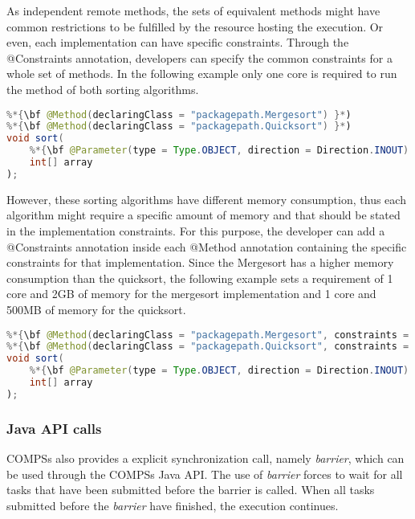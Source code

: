 As independent remote methods, the sets of equivalent methods might have common restrictions to be
fulfilled by the resource hosting the execution. Or even, each implementation can have specific constraints.
Through the @Constraints annotation, developers can specify the common constraints for a whole set of
methods. In the following example only one core is required to run the method of both sorting algorithms.

\begin{lstlisting}[language=java]
%*{\bf @Constraints(computingUnits = "1") }*)
%*{\bf @Method(declaringClass = "packagepath.Mergesort") }*)
%*{\bf @Method(declaringClass = "packagepath.Quicksort") }*)  
void sort(
    %*{\bf @Parameter(type = Type.OBJECT, direction = Direction.INOUT) }*)
    int[] array
);
\end{lstlisting}

However, these sorting algorithms have different memory consumption, thus each algorithm might require a
specific amount of memory and that should be stated in the implementation constraints. For this purpose, the
developer can add a @Constraints annotation inside each @Method annotation containing the specific constraints for that
implementation. Since the Mergesort has a higher memory consumption than the quicksort, the following
example sets a requirement of 1 core and 2GB of memory for the mergesort implementation and 1 core and
500MB of memory for the quicksort.

\begin{lstlisting}[language=java]
%*{\bf @Constraints(computingUnits = "1") }*)
%*{\bf @Method(declaringClass = "packagepath.Mergesort", constraints = @Constraints(memorySize = "2.0")) }*)
%*{\bf @Method(declaringClass = "packagepath.Quicksort", constraints = @Constraints(memorySize = "0.5")) }*)
void sort(
    %*{\bf @Parameter(type = Type.OBJECT, direction = Direction.INOUT) }*)
    int[] array
);
\end{lstlisting}


\subsubsection{Java API calls}

COMPSs also provides a explicit synchronization call, namely \textit{barrier}, which can be used through the COMPSs Java API.
The use of \textit{barrier} forces to wait for all tasks that have been submitted before the barrier is called.
When all tasks submitted before the \textit{barrier} have finished, the execution continues.

